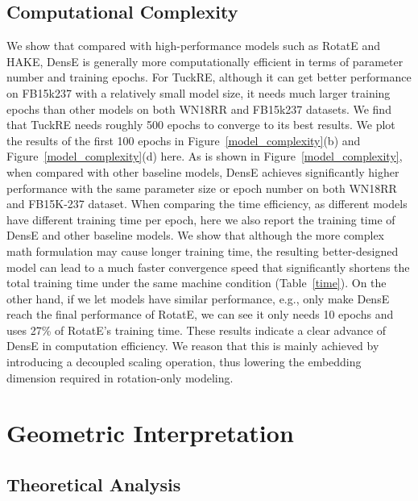 \documentclass[11pt]{article}
\begin{document}
\subsection{Computational Complexity} We show that compared with high-performance models such as RotatE and HAKE, DensE is generally more computationally efficient in terms of parameter number and training epochs. 
For TuckRE, although it can get better performance on FB15k237 with a relatively small model size, it needs much larger training epochs than other models on both WN18RR and FB15k237 datasets. We find that TuckRE needs roughly 500 epochs to converge to its best results. We plot the results of the first 100 epochs in Figure~\ref{model_complexity}(b) and Figure~\ref{model_complexity}(d) here.
As is shown in Figure~\ref{model_complexity}, when compared with other baseline models, DensE achieves significantly higher performance with the same parameter size or epoch number on both WN18RR and FB15K-237 dataset. 
When comparing the time efficiency, as different models have different training time per epoch, here we also report the training time of DensE and other baseline models. We show that although the more complex math formulation may cause longer training time, the resulting better-designed model can lead to a much faster convergence speed that significantly shortens the total training time under the same machine condition (Table~\ref{time}). 
On the other hand, if we let models have similar performance, e.g., only make DensE reach the final performance of RotatE, we can see it only needs 10 epochs and uses 27\% of RotatE's training time. These results indicate a clear advance of DensE in computation efficiency. We reason that this is mainly achieved by introducing a decoupled scaling operation, thus lowering the embedding dimension required in rotation-only modeling. 



\section{Geometric Interpretation}

\subsection{Theoretical Analysis}
\end{document}
